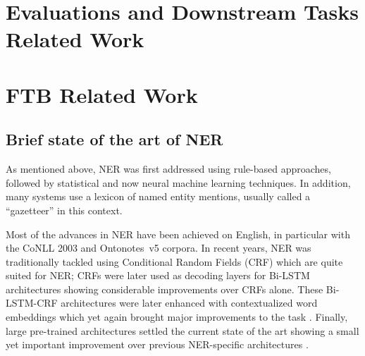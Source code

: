 \section{Evaluations and Downstream Tasks Related Work}

\section{FTB Related Work}


\subsection{Brief state of the art of NER}
\label{subsec:sota}

As mentioned above, NER was first addressed using rule-based approaches, followed by statistical and now neural machine learning techniques. In addition, many systems use a lexicon of named entity mentions, usually called a ``gazetteer'' in this context.

Most of the advances in NER  have been achieved on English, in particular with the CoNLL 2003 \cite{tjong-kim-sang-de-meulder-2003-introduction} and  Ontonotes~v5 \cite{pradhan-etal-2012-conll,pradhan-etal-2013-towards} corpora. In recent years, NER was traditionally tackled using Conditional Random Fields (CRF) \cite{lafferty-etal-2001-conditional} which are quite suited for NER; CRFs were later used as decoding layers for Bi-LSTM architectures \cite{huang-etal-2015-bidirectional,lample-etal-2016-neural} showing considerable improvements over CRFs alone. These Bi-LSTM-CRF architectures were later enhanced with contextualized word embeddings which yet again brought major improvements to the task \cite{peters-etal-2018-deep,akbik-etal-2018-contextual}. Finally, large pre-trained architectures settled the current state of the art showing a small yet important improvement over previous NER-specific architectures \cite{devlin-etal-2019-bert,baevski-etal-2019-cloze}.

